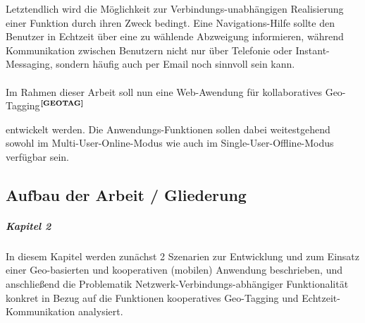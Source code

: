 \noindent
Letztendlich wird die Möglichkeit zur Verbindungs-unabhängigen Realisierung einer Funktion durch ihren Zweck bedingt. Eine Navigations-Hilfe sollte den Benutzer in Echtzeit über eine zu wählende Abzweigung informieren, während Kommunikation zwischen Benutzern nicht nur über Telefonie oder Instant-Messaging, sondern häufig auch per Email noch sinnvoll sein kann.\\ \\
\noindent
Im Rahmen dieser Arbeit soll nun eine Web-Awendung für kollaboratives Geo-Tagging$^{\textbf{\ref{GEOTAG}}}$%
\addtocounter{footnote}{1}%
entwickelt werden. Die Anwendungs-Funktionen sollen dabei weitestgehend sowohl im Multi-User-Online-Modus wie auch im Single-User-Offline-Modus verfügbar sein.

\subsection{Aufbau der Arbeit / Gliederung}
\subparagraph{Kapitel 2}
In diesem Kapitel werden zunächst 2 Szenarien zur Entwicklung und zum Einsatz einer Geo-basierten und kooperativen (mobilen) Anwendung beschrieben, und anschließend die Problematik Netzwerk-Verbindungs-abhängiger Funktionalität
konkret in Bezug auf die Funktionen kooperatives Geo-Tagging und Echtzeit-Kommunikation
analysiert.

